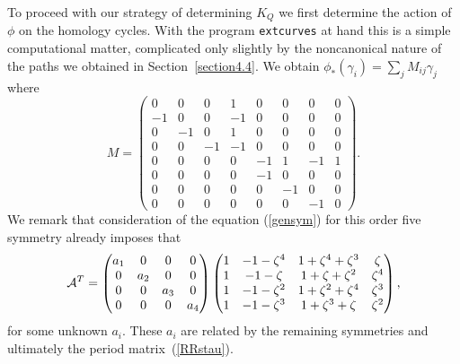\documentclass[pdftex]{sigma}
\newcommand{\extcurves}{\texttt{extcurves}\xspace}
\numberwithin{equation}{section}
\begin{document}
To proceed with our strategy of determining $K_Q$ we f\/irst
determine the action of $\phi$ on the homology cycles. With the program
\extcurves at
hand this is a simple computational matter, complicated only slightly by
the noncanonical nature of the paths we obtained in Section~\ref{section4.4}. We obtain $\phi_*(\gamma_i) =\sum_j M_{ij} \gamma_j$
where
\begin{equation*}
  M =
  \begin{pmatrix}
    0 & 0 & 0 & 1 & 0 & 0 & 0 & 0 \\
    -1 & 0 & 0 & -1 & 0 & 0 & 0 & 0 \\
    0 & -1 & 0 & 1 & 0 & 0 & 0 & 0 \\
    0 & 0 & -1 & -1 & 0 & 0 & 0 & 0 \\
    0 & 0 & 0 & 0 & -1 & 1 & -1 & 1 \\
    0 & 0 & 0 & 0 & -1 & 0 & 0 & 0 \\
    0 & 0 & 0 & 0 & 0 & -1 & 0 & 0 \\
    0 & 0 & 0 & 0 & 0 & 0 & -1 & 0
  \end{pmatrix}.
\end{equation*}
We remark that consideration of the equation (\ref{gensym}) for this
order f\/ive symmetry already imposes that
\[
  \mathcal{A}\sp{T}
  =
  \begin{pmatrix}
    a_1 & 0 & 0 & 0 \\
    0 & a_2 & 0 & 0 \\
    0 & 0 & a_3 & 0 \\
    0 & 0 & 0 & a_4
  \end{pmatrix}
  \begin{pmatrix}
    1 & -1-\zeta^4 & 1+\zeta^4+\zeta^3 & \zeta \\
    1 & -1-\zeta & 1+\zeta+\zeta^2 & \zeta^4 \\
    1 & -1-\zeta^2 & 1+\zeta^2+\zeta^4 & \zeta^3 \\
    1 & -1-\zeta^3 & 1+\zeta^3+\zeta & \zeta^2
  \end{pmatrix},
\]
for some unknown $a_i$. These $a_i$ are related by the remaining symmetries and
ultimately the period matrix~(\ref{RRstau}).
\end{document}

